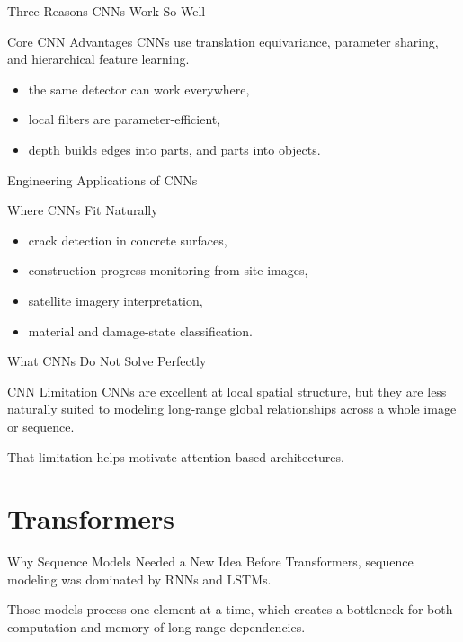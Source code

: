 \documentclass[12pt]{beamer}
\begin{document}
\begin{frame}{Three Reasons CNNs Work So Well}
  \begin{conceptbox}{Core CNN Advantages}
    CNNs use translation equivariance, parameter sharing, and hierarchical feature learning.
  \end{conceptbox}

  \begin{itemize}
    \item the same detector can work everywhere,
    \item local filters are parameter-efficient,
    \item depth builds edges into parts, and parts into objects.
  \end{itemize}
\end{frame}

\begin{frame}{Engineering Applications of CNNs}
  \begin{examplebox}{Where CNNs Fit Naturally}
    \begin{itemize}
      \item crack detection in concrete surfaces,
      \item construction progress monitoring from site images,
      \item satellite imagery interpretation,
      \item material and damage-state classification.
    \end{itemize}
  \end{examplebox}
\end{frame}

\begin{frame}{What CNNs Do Not Solve Perfectly}
  \begin{warningbox}{CNN Limitation}
    CNNs are excellent at local spatial structure, but they are less naturally suited to modeling long-range global relationships across a whole image or sequence.
  \end{warningbox}

  That limitation helps motivate attention-based architectures.
\end{frame}

\section{Transformers}

\begin{frame}{Why Sequence Models Needed a New Idea}
  Before Transformers, sequence modeling was dominated by RNNs and LSTMs.

  Those models process one element at a time, which creates a bottleneck for both computation and memory of long-range dependencies.
\end{frame}
\end{document}
